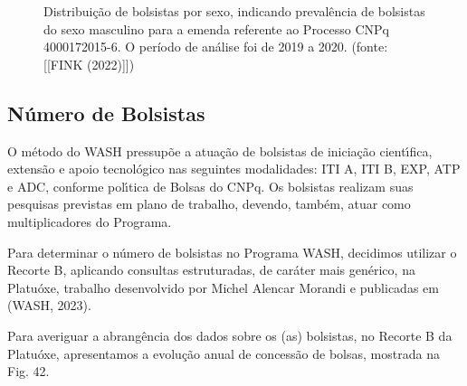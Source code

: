 \documentclass[
12pt,		%
openright,	%
twoside,  %
a4paper,			%
chapter=TITLE,		%
english,			%
french,				%
spanish,			%
brazil				%
]{USPSC-classe/USPSC}
\begin{document}
\begin{figure}[max size={\textwidth}{\textheight}]
\begin{minipage}[b]{0.4\linewidth}
                \caption{Distribui\c{c}\~ao de bolsistas por sexo, indicando preval\^encia de bolsistas do sexo masculino para a emenda referente ao Processo CNPq 4000172015-6. O per\'{i}odo de an\'alise foi de 2019 a 2020. (fonte: [[FINK (2022)]])}
                \label{1164a3115bd14e3f25b6b141840652ffbd0d2374}
\end{minipage}
\hspace{0.5cm}
\end{figure}



\subsection[N\'umero de Bolsistas]{N\'umero de Bolsistas}\label{N\'umero de Bolsistas}
O m\'etodo do WASH pressup\~oe a atua\c{c}\~ao de bolsistas de inicia\c{c}\~ao cient\'{\i}fica, extens\~ao e apoio tecnol\'ogico nas seguintes modalidades: ITI A, ITI B, EXP, ATP e ADC, conforme pol\'{\i}tica de Bolsas do CNPq. Os bolsistas realizam suas pesquisas previstas em plano de trabalho, devendo, tamb\'em, atuar como multiplicadores do Programa.

















Para determinar o n\'umero de bolsistas no Programa WASH, decidimos utilizar o Recorte B, aplicando consultas estruturadas, de car\'ater mais gen\'erico, na Platu\'oxe, trabalho desenvolvido por Michel Alencar Morandi e publicadas em (WASH, 2023).

















Para averiguar a abrang\^encia dos dados sobre os (as) bolsistas, no Recorte B da Platu\'oxe, apresentamos a evolu\c{c}\~ao anual de concess\~ao de bolsas, mostrada na Fig. 42.
\end{document}
